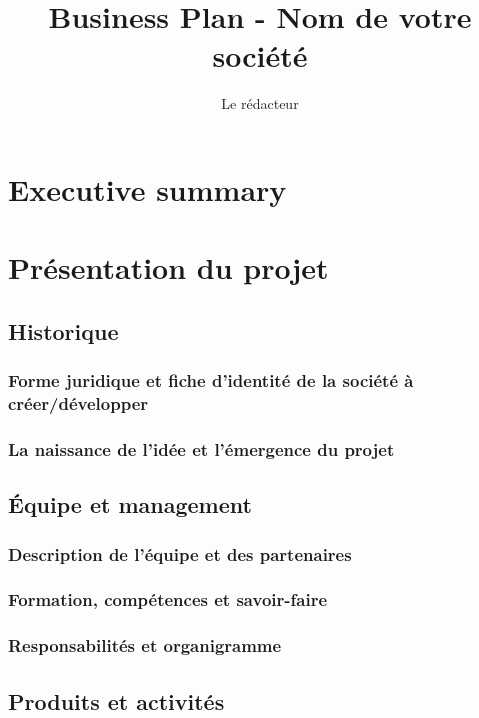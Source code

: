 \documentclass[a4paper]{report}
\title{Business Plan - Nom de votre société}
\author{Le rédacteur}
\begin{document}
\maketitle

\tableofcontents

\chapter{Executive summary}

\chapter{Présentation du projet}

\section{Historique}

\subsection{Forme juridique et fiche d’identité de la société à
créer/développer}

\subsection{La naissance de l’idée et l’émergence du projet}

\section{Équipe et management}

\subsection{Description de l'équipe et des partenaires}

\subsection{Formation, compétences et savoir-faire}

\subsection{Responsabilités et organigramme}

\section{Produits et activités}
\end{document}
